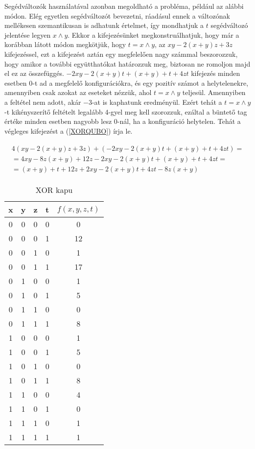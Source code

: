 Segédváltozók használatával azonban megoldható a probléma, például az alábbi módon. Elég egyetlen segédváltozót bevezetni, ráadásul ennek a változónak mellékesen szemantikusan is adhatunk értelmet, így mondhatjuk a $t$ segédváltozó jelentése legyen $x \wedge y$.
Ekkor a kifejezésünket megkonstruálhatjuk, hogy már a korábban látott módon megkötjük, hogy $t = x \wedge y$, az $xy-2(x+y)z+3z$ kifejezéssel, ezt a kifejezést aztán egy megfelelően nagy számmal beszorozzuk, hogy amikor a további együtthatókat határozzuk meg, biztosan ne romoljon majd el ez az összefüggés. $-2xy-2(x+y)t+(x+y)+t+4zt$ kifejezés minden esetben $0$-t ad a megfelelő konfigurációkra, és egy pozitív számot a helytelenekre, amennyiben csak azokat az eseteket nézzük, ahol $t = x \wedge  y$ teljesül. Amennyiben a feltétel nem adott, akár $-3$-at is kaphatunk eredményül. Ezért tehát a $t = x \wedge  y$-t kikényszerítő feltételt legalább 4-gyel meg kell szorozzuk, ezáltal a büntető tag értéke minden esetben nagyobb lesz $0$-nál, ha a konfiguráció helytelen. Tehát a végleges kifejezést a (\ref{XORQUBO}) írja le.



\begin{align}
\begin{split} \label{XORQUBO}
	4(xy-2(x+y)z+3z)+(-2xy-2(x+y)t+(x+y)+t+4zt) = \\
    = 4xy-8z(x+y)+12z-2xy-2(x+y)t+(x+y)+t+4zt = \\
	= (x+y)+t+12z+2xy-2(x+y)t+4zt-8z(x+y)	
\end{split}
\end{align}

\begin{table}[ht]
	\footnotesize
	\centering
	\begin{tabular}{ c c c c c }
		\toprule
		x & y & z & t & $f(x,y,z,t)$ \\
		\midrule
		0 & 0 & 0 & 0 & 0 \\
		0 & 0 & 0 & 1 & 12 \\
		0 & 0 & 1 & 0 & 1 \\
		0 & 0 & 1 & 1 & 17 \\
		0 & 1 & 0 & 0 & 1 \\
		0 & 1 & 0 & 1 & 5 \\
		0 & 1 & 1 & 0 & 0 \\
		0 & 1 & 1 & 1 & 8 \\		
		1 & 0 & 0 & 0 & 1 \\
		1 & 0 & 0 & 1 & 5 \\
		1 & 0 & 1 & 0 & 0 \\
		1 & 0 & 1 & 1 & 8 \\
		1 & 1 & 0 & 0 & 4 \\
		1 & 1 & 0 & 1 & 0 \\
		1 & 1 & 1 & 0 & 1 \\
		1 & 1 & 1 & 1 & 1 \\		
		\bottomrule
	\end{tabular}
	\caption{XOR kapu}
	\label{tab:XORgate}
\end{table}

